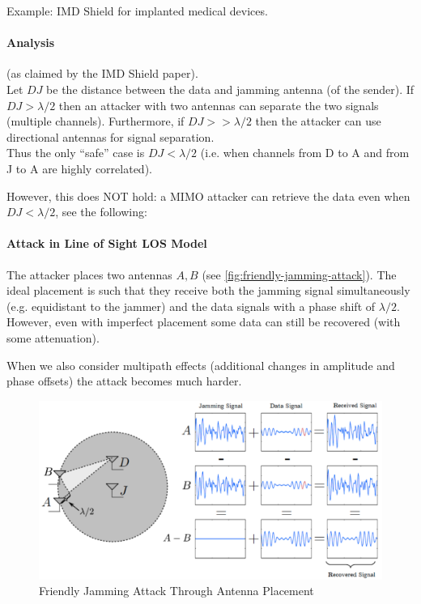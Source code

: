 Example: IMD Shield for implanted medical devices.

\paragraph{Analysis} (as claimed by the IMD Shield paper). \\
Let $DJ$ be the distance between the data and jamming antenna (of the sender).
If $DJ > \lambda/2$ then an attacker with two antennas can separate the two signals (multiple channels).
Furthermore, if $DJ >> \lambda/2$ then the attacker can use directional antennas for signal separation.
\\
Thus the only ``safe'' case is $DJ < \lambda/2$ (i.e. when channels from D to A and from J to A are highly correlated).

However, this does NOT hold:
a MIMO attacker can retrieve the data even when $DJ < \lambda/2$, see the following:

\paragraph{Attack in Line of Sight LOS Model} 
The attacker places two antennas $A, B$ (see \autoref{fig:friendly-jamming-attack}).
The ideal placement is such that they receive both the jamming signal simultaneously (e.g. equidistant to the jammer) and the data signals with a phase shift of $\lambda/2$.
However, even with imperfect placement some data can still be recovered (with some attenuation).

When we also consider multipath effects (additional changes in amplitude and phase offsets) the attack becomes much harder.

\begin{figure}
	\centering
	\includegraphics[scale=0.4]{images/7-friendly-jamming-attack.png}
	\caption{Friendly Jamming Attack Through Antenna Placement}
	\label{fig:friendly-jamming-attack}
\end{figure}

